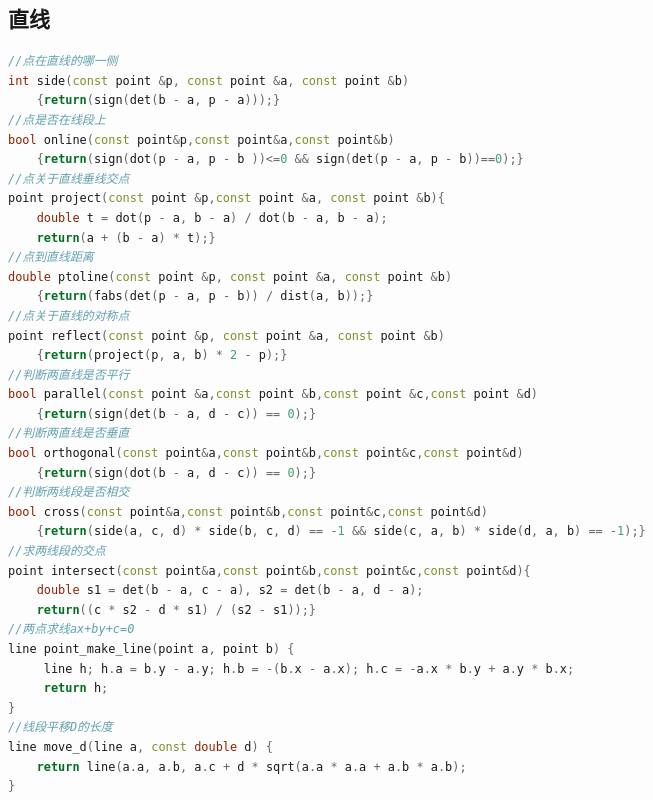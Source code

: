 \documentclass[landscape,a4paper]{article}
\begin{document}
\begin{spacing}{0.3}
\begin{multicols}{2}
\subsection{直线}
\begin{lstlisting}[language=C++]
//点在直线的哪一侧
int side(const point &p, const point &a, const point &b)
    {return(sign(det(b - a, p - a)));}
//点是否在线段上
bool online(const point&p,const point&a,const point&b)
    {return(sign(dot(p - a, p - b ))<=0 && sign(det(p - a, p - b))==0);}
//点关于直线垂线交点
point project(const point &p,const point &a, const point &b){
    double t = dot(p - a, b - a) / dot(b - a, b - a);
    return(a + (b - a) * t);}
//点到直线距离
double ptoline(const point &p, const point &a, const point &b)
    {return(fabs(det(p - a, p - b)) / dist(a, b));}
//点关于直线的对称点
point reflect(const point &p, const point &a, const point &b)
    {return(project(p, a, b) * 2 - p);}
//判断两直线是否平行
bool parallel(const point &a,const point &b,const point &c,const point &d)
    {return(sign(det(b - a, d - c)) == 0);}
//判断两直线是否垂直
bool orthogonal(const point&a,const point&b,const point&c,const point&d)
    {return(sign(dot(b - a, d - c)) == 0);}
//判断两线段是否相交
bool cross(const point&a,const point&b,const point&c,const point&d)
    {return(side(a, c, d) * side(b, c, d) == -1 && side(c, a, b) * side(d, a, b) == -1);}
//求两线段的交点
point intersect(const point&a,const point&b,const point&c,const point&d){
    double s1 = det(b - a, c - a), s2 = det(b - a, d - a);
    return((c * s2 - d * s1) / (s2 - s1));}
//两点求线ax+by+c=0
line point_make_line(point a, point b) {
     line h; h.a = b.y - a.y; h.b = -(b.x - a.x); h.c = -a.x * b.y + a.y * b.x;
     return h;
}
//线段平移D的长度
line move_d(line a, const double d) {
	return line(a.a, a.b, a.c + d * sqrt(a.a * a.a + a.b * a.b);
}
\end{lstlisting}

\end{multicols}
\end{spacing}
\end{document}
